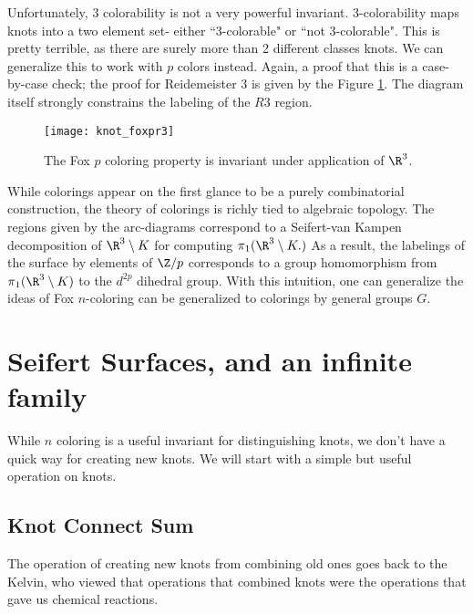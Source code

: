 Unfortunately, 3 colorability is not a very powerful invariant. 3-colorability maps knots into a two element set- either ``3-colorable" or ``not 3-colorable". This is pretty terrible, as there are surely more than 2 different classes knots. We can generalize this to work with $p$ colors instead.  
Again, a proof that this is a case-by-case check; the proof for Reidemeister 3 is given by the Figure \ref{fig:knot_foxpr3}.  The diagram itself strongly constrains the labeling of the $R3$ region.  
\begin{figure}
\centering
\texttt{[image: knot\_foxpr3]}
\caption{The Fox $p$ coloring property is invariant under application of $\R^3$. }
\label{fig:knot_foxpr3}
\end{figure}
While colorings appear on the first glance to be a purely combinatorial construction, the theory of colorings is richly tied to algebraic topology. The regions given by the arc-diagrams correspond to a Seifert-van Kampen decomposition of $\R^3\setminus K$ for computing $\pi_1(\R^3\setminus K.)$ As a result, the labelings of the surface by elements of $\Z/p$ corresponds to a group homomorphism from $\pi_1(\R^3\setminus K)$ to the \project \label{proj:groupcoloring} $d^{2p}$ dihedral group. With this intuition, one can generalize the ideas of Fox $n$-coloring can be generalized to colorings by general groups $G$. 
\section{Seifert Surfaces, and an infinite family}
While $n$ coloring is a useful invariant for distinguishing knots, we don't have a quick way for creating new knots. We will start with a simple but useful operation on knots. 
\subsection{Knot Connect Sum}
The operation of creating new knots from combining old ones goes back to the Kelvin, who viewed that operations that combined knots were the operations that gave us chemical reactions. 

